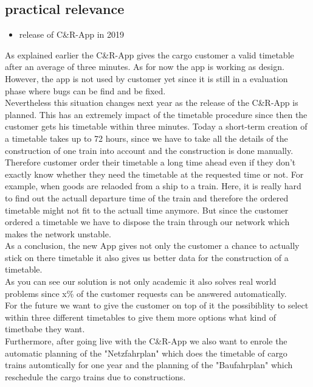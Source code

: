 \subsection{practical relevance}
\begin{itemize}
  \item release of C\&R-App in 2019 \\
\end{itemize}
As explained earlier the C\&R-App gives the cargo customer a valid timetable after an average of three minutes. As for now the app is working as design. However, the app is not used by customer yet since it is still in a evaluation phase where bugs can be find and be fixed. \\
Nevertheless this situation changes next year as the release of the C\&R-App is planned. This has an extremely impact of the timetable procedure since then the customer gets his timetable within three minutes. Today a short-term creation of a timetable takes up to 72 hours, since we have to take all the details of the construction of one train into account and the construction is done manually. Therefore customer order their timetable a long time ahead even if they don't exactly know whether they need the timetable at the requested time or not. For example, when goods are relaoded from a ship to a train. Here, it is really hard to find out the actuall departure time of the train and therefore the ordered timetable might not fit to the actuall time anymore. But since the customer ordered a timetable we have to dispose the train through our network which makes the network unstable. \\
As a conclusion, the new App gives not only the customer a chance to actually stick on there timetable it also gives us better data for the construction of a timetable. \\
As you can see our solution is not only academic it also solves real world problems since x\% of the customer requests can be answered automatically. \\
For the future we want to give the customer on top of it the possibiblity to select within three different timetables to give them more options what kind of timetbabe they want. \\
Furthermore, after going live with the C\&R-App we also want to enrole the automatic planning of the "Netzfahrplan" which does the timetable of cargo trains automtically for one year and the planning of the "Baufahrplan" which reschedule the cargo trains due to constructions. \\
